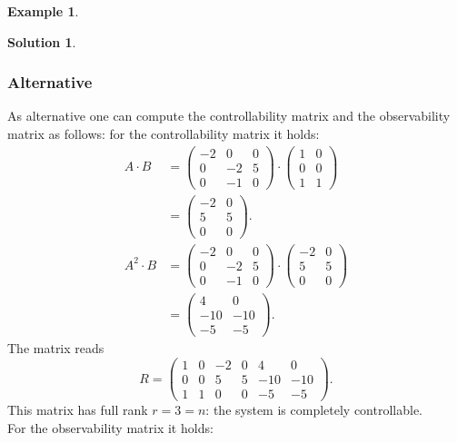 \documentclass[a4paper,12 pt]{article}
\numberwithin{equation}{section}
\theoremstyle{definition}
\newtheorem{bsp}{Example}
\theoremstyle{remark}
\theoremstyle{definition}
\newtheorem*{lsg}{Solution}
\theoremstyle{definition}
\theoremstyle{definition}
\theoremstyle{remark}
\begin{document}
\begin{bsp}
\begin{lsg}
\begin{enumerate}[(a)]
\subsubsection*{Alternative}
As alternative one can compute the controllability matrix and the observability matrix as follows: for the controllability matrix it holds:
\begin{equation*}
\begin{split}
A\cdot B&=\begin{pmatrix}
-2&0&0\\
0&-2&5\\
0&-1&0
\end{pmatrix}\cdot \begin{pmatrix} 1&0\\
0&0\\
1&1
\end{pmatrix}\\
&=\begin{pmatrix}
-2&0\\
5&5\\
0&0
\end{pmatrix}.\\
A^2\cdot B&=\begin{pmatrix}
-2&0&0\\
0&-2&5\\
0&-1&0
\end{pmatrix} \cdot \begin{pmatrix}
-2&0\\
5&5\\
0&0
\end{pmatrix}\\
&=\begin{pmatrix}
4&0\\
-10&-10\\
-5&-5
\end{pmatrix}.
\end{split}
\end{equation*}
The matrix reads
\begin{equation*}
R=\begin{pmatrix}
1&0&-2&0&4&0\\
0&0&5&5&-10&-10\\
1&1&0&0&-5&-5
\end{pmatrix}.
\end{equation*}
This matrix has full rank $r=3=n$: the system is completely controllable.\\
For the observability matrix it holds:
\begin{equation*}
\begin{split}

\end{split}
\end{equation*}
\end{enumerate}
\end{lsg}
\end{bsp}
\end{document}
